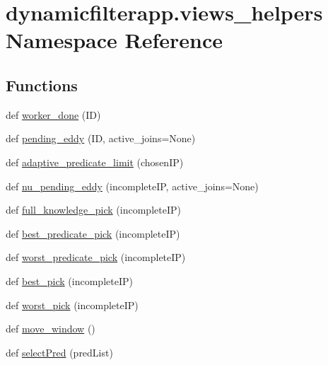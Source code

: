 \hypertarget{namespacedynamicfilterapp_1_1views__helpers}{}\section{dynamicfilterapp.\+views\+\_\+helpers Namespace Reference}
\label{namespacedynamicfilterapp_1_1views__helpers}
\subsection*{Functions}
\begin{DoxyCompactItemize}
\item 
def \hyperlink{namespacedynamicfilterapp_1_1views__helpers_af27860dfe5bfa6b2b8a1b29347eb918d}{worker\+\_\+done} (ID)
\item 
def \hyperlink{namespacedynamicfilterapp_1_1views__helpers_ad11bcb9737901ab723493b4f7fe09329}{pending\+\_\+eddy} (ID, active\+\_\+joins=None)
\item 
def \hyperlink{namespacedynamicfilterapp_1_1views__helpers_ac0d019064d0a4dff3cd08f7ea4c4d560}{adaptive\+\_\+predicate\+\_\+limit} (chosen\+IP)
\item 
def \hyperlink{namespacedynamicfilterapp_1_1views__helpers_a0166128faa543e6b533e3fc103de243b}{nu\+\_\+pending\+\_\+eddy} (incomplete\+IP, active\+\_\+joins=None)
\item 
def \hyperlink{namespacedynamicfilterapp_1_1views__helpers_a19a0b5e8e5ce5def8165fcd0558ca88d}{full\+\_\+knowledge\+\_\+pick} (incomplete\+IP)
\item 
def \hyperlink{namespacedynamicfilterapp_1_1views__helpers_a6f82774700f533bb63a288a3949ee0d8}{best\+\_\+predicate\+\_\+pick} (incomplete\+IP)
\item 
def \hyperlink{namespacedynamicfilterapp_1_1views__helpers_a0fc083f3d6a368a4f543011330fff151}{worst\+\_\+predicate\+\_\+pick} (incomplete\+IP)
\item 
def \hyperlink{namespacedynamicfilterapp_1_1views__helpers_a31c7bc791ed2c2c02c139599e02990ed}{best\+\_\+pick} (incomplete\+IP)
\item 
def \hyperlink{namespacedynamicfilterapp_1_1views__helpers_a9b2092a89d40943b1572b5c8fb873d86}{worst\+\_\+pick} (incomplete\+IP)
\item 
def \hyperlink{namespacedynamicfilterapp_1_1views__helpers_aa0f3d2407bfd2bfc1074a0fb2f82a336}{move\+\_\+window} ()
\item 
def \hyperlink{namespacedynamicfilterapp_1_1views__helpers_a76037300b9b8c326be6d116519d5a8b9}{select\+Pred} (pred\+List)

\end{DoxyCompactItemize}
